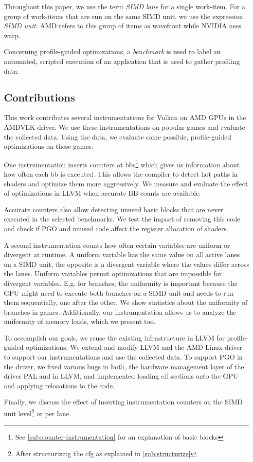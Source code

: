Throughout this paper, we use the term \emph{SIMD lane} for a single work-item.
For a group of work-items that are run on the same SIMD unit, we use the expression \emph{SIMD unit}.
AMD refers to this group of items as wavefront while NVIDIA uses warp.

Concerning profile-guided optimizations, a \emph{benchmark} is used to label an automated, scripted execution of an application that is used to gather profiling data.


\subsection{Contributions}
\label{sub:contributions}
This work contributes several instrumentations for Vulkan on AMD GPUs in the AMDVLK driver.
We use these instrumentations on popular games and evaluate the collected data. Using the data, we evaluate some possible, profile-guided optimizations on these games.

One instrumentation inserts counters at \glspl{bb}\footnote{See \cref{sub:counter-instrumentation} for an explanation of basic blocks} which gives us information about how often each \gls{bb} is executed.
This allows the compiler to detect hot paths in shaders and optimize them more aggressively.
We measure and evaluate the effect of optimizations in LLVM when accurate BB counts are available.

Accurate counters also allow detecting unused basic blocks that are never executed in the selected benchmarks. We test the impact of removing this code and check if PGO and unused code affect the register allocation of shaders.

A second instrumentation counts how often certain variables are uniform or divergent at runtime. A uniform variable has the same value on all active lanes on a SIMD unit, the opposite is a divergent variable where the values differ across the lanes.
Uniform variables permit optimizations that are impossible for divergent variables.
E.g. for branches, the uniformity is important because the GPU might need to execute both branches on a SIMD unit and needs to run them sequentially, one after the other.
We show statistics about the uniformity of branches in games.
Additionally, our instrumentation allows us to analyze the uniformity of memory loads, which we present too.

To accomplish our goals, we reuse the existing infrastructure in LLVM for profile-guided optimizations.
We extend and modify LLVM and the AMD Linux driver to support our instrumentations and use the collected data.
To support PGO in the driver, we fixed various bugs in both, the hardware management layer of the driver PAL and in LLVM, and implemented loading \gls{elf} sections onto the GPU and applying relocations to the code.

Finally, we discuss the effect of inserting instrumentation counters on the SIMD unit level\footnote{After structurizing the \gls{cfg} as explained in \cref{sub:structurize}} or per lane.
